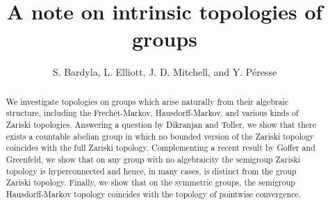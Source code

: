 \documentclass[11pt]{amsart}
\author{S. Bardyla, L. Elliott, J. D. Mitchell, and Y. P\'eresse}
\title{A note on intrinsic topologies of groups}
\theoremstyle{definition}
\begin{document}
\begin{abstract}
We investigate topologies on groups which arise naturally from their algebraic structure, including the Frech\'et-Markov, Hausdorff-Markov, and various kinds of Zariski topologies. 
Answering a question by Dikranjan and Toller, we show that there exists a countable abelian group in which no bounded version of the Zariski topology coincides with the full Zariski topology. Complementing a recent result by Goffer and Greenfeld, we show that on any group with no algebraicity the semigroup Zariski topology is hyperconnected and hence, in many cases, is distinct from the group Zariski topology. 
Finally, we show that on the symmetric groups, the semigroup Hausdorff-Markov topology coincides with the topology of pointwise convergence.  
    \end{abstract}


    \maketitle

\end{document}
